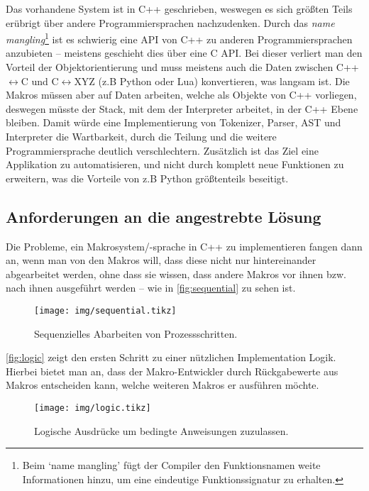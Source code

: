     Das vorhandene System ist in C++ geschrieben, weswegen es sich größten Teils erübrigt über andere Programmiersprachen nachzudenken. Durch das \emph{name mangling}\footnote{
      Beim `name mangling' fügt der Compiler den Funktionsnamen weite Informationen hinzu, um eine eindeutige Funktionssignatur zu erhalten.
    } ist es schwierig eine API von C++ zu anderen Programmiersprachen anzubieten -- meistens geschieht dies über eine C API. Bei dieser verliert man den Vorteil der Objektorientierung und muss meistens auch die Daten zwischen C++$\longleftrightarrow$C und C$\longleftrightarrow$XYZ (z.B Python oder Lua) konvertieren, was langsam ist. Die Makros müssen aber auf Daten arbeiten, welche als Objekte von C++ vorliegen, deswegen müsste der Stack, mit dem der Interpreter arbeitet, in der C++ Ebene bleiben. Damit würde eine Implementierung von Tokenizer, Parser, AST und Interpreter die Wartbarkeit, durch die Teilung und die weitere Programmiersprache deutlich verschlechtern. Zusätzlich ist das Ziel eine Applikation zu automatisieren, und nicht durch komplett neue Funktionen zu erweitern, was die Vorteile von z.B Python größtenteils beseitigt.

  \subsection{Anforderungen an die angestrebte Lösung}
  \label{ssec:Anforderungen an die angestrebte Lösung}
    Die Probleme, ein Makrosystem/-sprache in C++ zu implementieren fangen dann an, wenn man von den Makros will, dass diese nicht nur hintereinander abgearbeitet werden, ohne dass sie wissen, dass andere Makros vor ihnen bzw. nach ihnen ausgeführt werden -- wie in \autoref{fig:sequential} zu sehen ist.

    \begin{figure}[H]
      \centering
      \texttt{[image: img/sequential.tikz]}
      \caption{Sequenzielles Abarbeiten von Prozessschritten.}
      \label{fig:sequential}
    \end{figure}

    \autoref{fig:logic} zeigt den ersten Schritt zu einer nützlichen Implementation Logik. Hierbei bietet man an, dass der Makro-Entwickler durch Rückgabewerte aus Makros entscheiden kann, welche weiteren Makros er ausführen möchte.

    \begin{figure}[H]
      \centering
      \texttt{[image: img/logic.tikz]}
      \caption{Logische Ausdrücke um bedingte Anweisungen zuzulassen.}
      \label{fig:logic}
    \end{figure}

